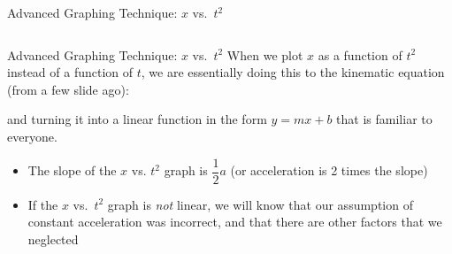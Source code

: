 \documentclass[12pt,compress,aspectratio=169,dvipsnames]{beamer}
\begin{document}
\begin{frame}{Advanced Graphing Technique: $x$ vs.\ $t^2$}
\begin{columns}[T]
  \end{columns}
\end{frame}



\begin{frame}{Advanced Graphing Technique: $x$ vs.\ $t^2$}
  When we plot $x$ as a function of $t^2$ instead of a function of $t$, we are
  essentially doing this to the kinematic equation (from a few slide ago):

  
  \vspace{-.05in}and turning it into a linear function in the form $y=mx+b$
  that is familiar to everyone.
  \begin{itemize}
  \item The slope of the $x$ vs. $t^2$ graph is $\dfrac12a$ (or acceleration
    is 2 times the slope)
  \item If the $x$ vs.\ $t^2$ graph is \emph{not} linear, we will know that
    our assumption of constant acceleration was incorrect, and that there are
    other factors that we neglected
  \end{itemize}
\end{frame}
\end{document}
